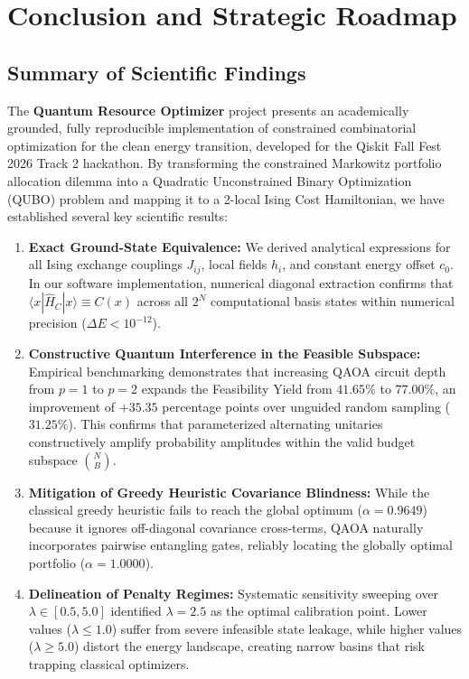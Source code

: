 \chapter{Conclusion and Strategic Roadmap}
\label{chap:conclusion}

\section{Summary of Scientific Findings}
The \textbf{Quantum Resource Optimizer} project presents an academically grounded, fully reproducible implementation of constrained combinatorial optimization for the clean energy transition, developed for the Qiskit Fall Fest 2026 Track 2 hackathon. By transforming the constrained Markowitz portfolio allocation dilemma into a Quadratic Unconstrained Binary Optimization (QUBO) problem and mapping it to a 2-local Ising Cost Hamiltonian, we have established several key scientific results:

\begin{enumerate}
    \item \textbf{Exact Ground-State Equivalence:} We derived analytical expressions for all Ising exchange couplings $J_{ij}$, local fields $h_i$, and constant energy offset $c_0$. In our software implementation, numerical diagonal extraction confirms that $\langle x | \hat{H}_C | x \rangle \equiv C(x)$ across all $2^N$ computational basis states within numerical precision ($\Delta E < 10^{-12}$).
    
    \item \textbf{Constructive Quantum Interference in the Feasible Subspace:} Empirical benchmarking demonstrates that increasing QAOA circuit depth from $p=1$ to $p=2$ expands the Feasibility Yield from $41.65\%$ to $77.00\%$, an improvement of $+35.35$ percentage points over unguided random sampling ($31.25\%$). This confirms that parameterized alternating unitaries constructively amplify probability amplitudes within the valid budget subspace $\binom{N}{B}$.
    
    \item \textbf{Mitigation of Greedy Heuristic Covariance Blindness:} While the classical greedy heuristic fails to reach the global optimum ($\alpha = 0.9649$) because it ignores off-diagonal covariance cross-terms, QAOA naturally incorporates pairwise entangling gates, reliably locating the globally optimal portfolio ($\alpha = 1.0000$).
    
    \item \textbf{Delineation of Penalty Regimes:} Systematic sensitivity sweeping over $\lambda \in [0.5, 5.0]$ identified $\lambda = 2.5$ as the optimal calibration point. Lower values ($\lambda \le 1.0$) suffer from severe infeasible state leakage, while higher values ($\lambda \ge 5.0$) distort the energy landscape, creating narrow basins that risk trapping classical optimizers.
\end{enumerate}


